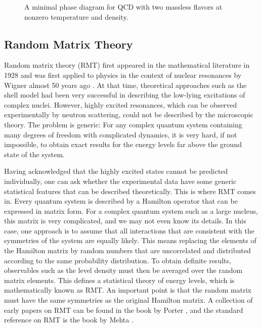 \begin{figure}
  \begin{center}
    \caption{A minimal phase diagram for QCD with two massless flavors
      at nonzero temperature and density.}
    \label{fig1}
  \end{center}
\end{figure}

\subsection{Random Matrix Theory}
\label{sec1.2}

Random matrix theory (RMT) first appeared
in the mathematical literature in 1928 \cite{Wish28} and was first
applied to physics in the context of nuclear resonances by Wigner
almost 50 years ago \cite{Wign51}.  At that time, theoretical
approaches such as the shell model had been very successful in
describing the low-lying excitations of complex nuclei.  However,
highly excited resonances, which can be observed experimentally by
neutron scattering, could not be described by the microscopic theory.
The problem is generic: For any complex
quantum system containing many degrees of freedom with complicated
dynamics, it is very hard, if not impossible, to obtain exact results
for the energy levels far above the ground state of the system.

Having acknowledged that the highly excited states cannot be predicted
individually, one can ask whether the experimental data have some
generic statistical features that can be described theoretically.
This is where RMT comes in.  Every quantum system is
described by a Hamilton operator that can be expressed in matrix
form.  For a complex quantum system such as a large nucleus, this
matrix is very complicated, and we may not even know its details.  In
this case, one approach is to assume that all interactions
that are consistent with the symmetries of the system are equally
likely.  This means replacing the elements of the Hamilton matrix by
random numbers that are uncorrelated and distributed according to the
same probability distribution.  To obtain definite results,
observables such as the level density must then be averaged over the
random matrix elements.  This defines a statistical theory of energy
levels, which is mathematically known as RMT.  An
important point is that the random matrix must have the same
symmetries as the original Hamilton matrix. A collection of early
papers on RMT can be found in the book by Porter \cite{Porter}, and
the standard reference on RMT is the book by Mehta \cite{Mehta}.


